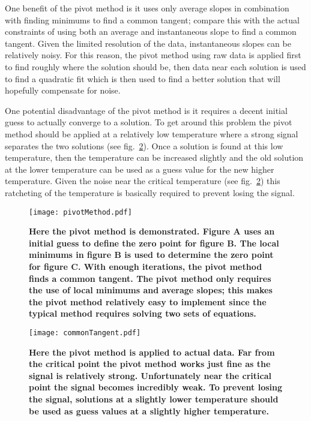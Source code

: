 One benefit of the pivot method is it uses only average slopes in combination with finding minimums to find a common tangent; compare this with the actual constraints of using both an average and instantaneous slope to find a common tangent. Given the limited resolution of the data, instantaneous slopes can be relatively noisy. For this reason, the pivot method using raw data is applied first to find roughly where the solution should be, then data near each solution is used to find a quadratic fit which is then used to find a better solution that will hopefully compensate for noise.

One potential disadvantage of the pivot method is it requires a decent initial guess to actually converge to a solution. To get around this problem the pivot method should be applied at a relatively low temperature where a strong signal separates the two solutions (see fig.~\ref{fig:FdispVsff}). Once a solution is found at this low temperature, then the temperature can be increased slightly and the old solution at the lower temperature can be used as a guess value for the new higher temperature. Given the noise near the critical temperature (see fig.~\ref{fig:FdispVsff}) this ratcheting of the temperature is basically required to prevent losing the signal.

\begin{figure}[h!]
\hspace*{-6mm}
	\centering
	\texttt{[image: pivotMethod.pdf]}
	\caption{\label{fig:pivotMethod}
	\scriptsize \textbf{Here the pivot method is demonstrated. Figure A uses an initial guess to define the zero point for figure B. The local minimums in figure B is used to determine the zero point for figure C. With enough iterations, the pivot method finds a common tangent. The pivot method only requires the use of local minimums and average slopes; this makes the pivot method relatively easy to implement since the typical method requires solving two sets of equations.}}
	
\end{figure}
\begin{figure}[!h]

\hspace*{-6mm}
	\centering
	\texttt{[image: commonTangent.pdf]}
	\caption{\scriptsize \textbf{Here the pivot method is applied to actual data. Far from the critical point the pivot method works just fine as the signal is relatively strong. Unfortunately near the critical point the signal becomes incredibly weak. To prevent losing the signal, solutions at a slightly lower temperature should be used as guess values at a slightly higher temperature.}}
	\label{fig:FdispVsff}
\end{figure}




